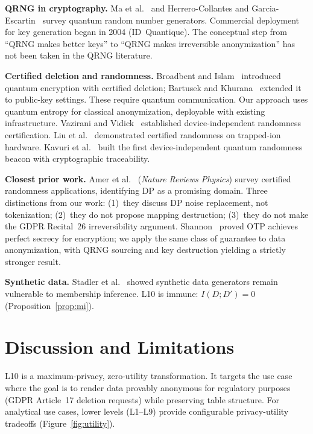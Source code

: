 \documentclass[acmsmall,screen,review,anonymous]{acmart}
\begin{document}
\textbf{QRNG in cryptography.} Ma et al.~\cite{ma2016qrng} and Herrero-Collantes and Garcia-Escartin~\cite{herrero2017qrng} survey quantum random number generators. Commercial deployment for key generation began in 2004 (ID~Quantique). The conceptual step from ``QRNG makes better keys'' to ``QRNG makes irreversible anonymization'' has not been taken in the QRNG literature.

\textbf{Certified deletion and randomness.} Broadbent and Islam~\cite{broadbent2020certified} introduced quantum encryption with certified deletion; Bartusek and Khurana~\cite{bartusek2023certified} extended it to public-key settings. These require quantum communication. Our approach uses quantum entropy for classical anonymization, deployable with existing infrastructure. Vazirani and Vidick~\cite{vazirani2012certifiable} established device-independent randomness certification. Liu et al.~\cite{liu2025certified} demonstrated certified randomness on trapped-ion hardware. Kavuri et al.~\cite{kavuri2025traceable} built the first device-independent quantum randomness beacon with cryptographic traceability.

\textbf{Closest prior work.} Amer et al.~\cite{amer2025certified} (\emph{Nature Reviews Physics}) survey certified randomness applications, identifying DP as a promising domain. Three distinctions from our work: (1)~they discuss DP noise replacement, not tokenization; (2)~they do not propose mapping destruction; (3)~they do not make the GDPR Recital~26 irreversibility argument. Shannon~\cite{shannon1949secrecy} proved OTP achieves perfect secrecy for encryption; we apply the same class of guarantee to data anonymization, with QRNG sourcing and key destruction yielding a strictly stronger result.

\textbf{Synthetic data.} Stadler et al.~\cite{stadler2022synthetic} showed synthetic data generators remain vulnerable to membership inference. L10 is immune: $I(D; D') = 0$ (Proposition~\ref{prop:mi}).

\section{Discussion and Limitations}
\label{sec:discussion}

L10 is a maximum-privacy, zero-utility transformation. It targets the use case where the goal is to render data provably anonymous for regulatory purposes (GDPR Article~17 deletion requests) while preserving table structure. For analytical use cases, lower levels (L1--L9) provide configurable privacy-utility tradeoffs (Figure~\ref{fig:utility}).
\end{document}
